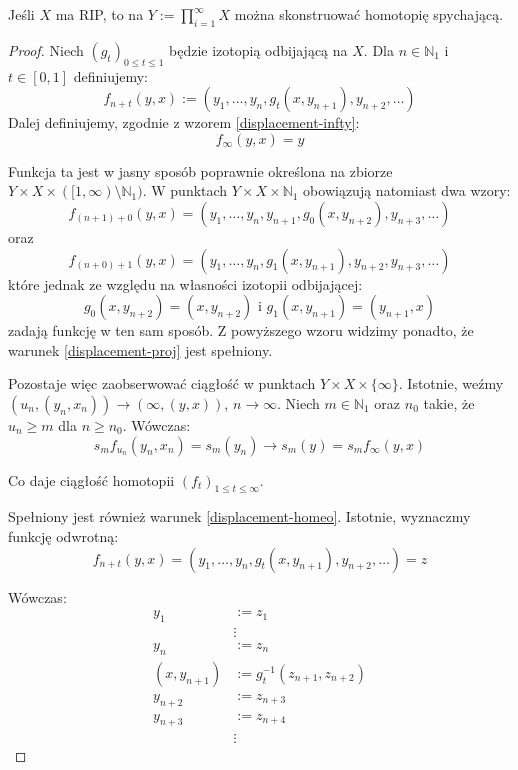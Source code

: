 \begin{thm}
  \label{thm:displacement-homotopy}
  Jeśli $X$ ma RIP, to na $Y := \prod_{i=1}^\infty X$ można skonstruować homotopię spychającą.
  \begin{proof}
    Niech $(g_t)_{0 \leq t \leq 1}$ będzie izotopią odbijającą na $X$. Dla $n \in \mathbb{N}_1$ i $t \in [0,1]$ definiujemy:
    \[f_{n+t}(y,x) := (y_1, \ldots, y_n, g_t(x, y_{n+1}), y_{n+2}, \ldots)\]
    Dalej definiujemy, zgodnie z wzorem \ref{displacement-infty}:
    \[f_\infty(y,x) = y\]
    
    Funkcja ta jest w jasny sposób poprawnie określona na zbiorze $Y \times X \times ([1, \infty) \setminus \mathbb{N}_1)$. W punktach $Y \times X \times \mathbb{N}_1$ obowiązują natomiast dwa wzory:
    \[f_{(n+1) + 0}(y,x) = (y_1, \ldots, y_n, y_{n+1}, g_0(x, y_{n+2}), y_{n+3}, \ldots)\]
    oraz
    \[f_{(n+0) + 1}(y,x) = (y_1, \ldots, y_n, g_1(x, y_{n+1}), y_{n+2}, y_{n+3}, \ldots)\]
    które jednak ze względu na własności izotopii odbijającej:
    \[g_0(x, y_{n+2}) = (x, y_{n+2}) \mbox{ i } g_1(x, y_{n+1}) = (y_{n+1}, x)\]
    zadają funkcję w ten sam sposób. Z powyższego wzoru widzimy ponadto, że warunek \ref{displacement-proj} jest spełniony.
    
    Pozostaje więc zaobserwować ciągłość w punktach $Y \times X \times \{\infty\}$. Istotnie, weźmy $(u_n, (y_n, x_n)) \rightarrow (\infty, (y,x))$, $n \rightarrow \infty$. Niech $m \in \mathbb{N}_1$ oraz $n_0$ takie, że $u_n \geq m$ dla $n \geq n_0$. Wówczas:
    \[s_m f_{u_n}(y_n, x_n) = s_m(y_n) \rightarrow s_m(y) = s_m f_\infty (y,x)\]
    
    Co daje ciągłość homotopii $(f_t)_{1 \leq t \leq \infty}$.
    
    Spełniony jest również warunek \ref{displacement-homeo}. Istotnie, wyznaczmy funkcję odwrotną:
    \[f_{n+t}(y,x) = (y_1, \ldots, y_n, g_t(x, y_{n+1}), y_{n+2}, \ldots) = z\]
    
    Wówczas:
    \begin{align*}
      y_1 &:= z_1 \\
      & \vdots \\
      y_n &:= z_n \\
      (x, y_{n+1}) &:= g_t^{-1}(z_{n+1}, z_{n+2}) \\
      y_{n+2} &:= z_{n+3} \\
      y_{n+3} &:= z_{n+4} \\
      & \vdots
    \end{align*}


\end{proof}
\end{thm}

